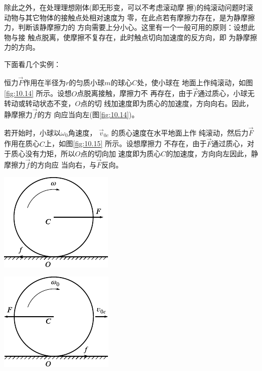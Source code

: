 除此之外，在处理理想刚体(即无形变，可以不考虑滚动摩
擦)的纯滚动问题时滚动物与其它物体的接触点处相对速度为
零，在此点若有摩擦力存在，是为静摩擦力，判断该静摩擦力的
方向需要上分小心。这里有一个一般可用的原则：设想此物与接
触点脱离，使摩擦不复存在，此时触点切向加速度的反方向，即
为静摩擦力的方向。

下面看几个实例：

恒力$\vec{ F }$作用在半径为$ r $的匀质小球$ m $的球心$ C $处，使小球在
地面上作纯滚动，如图\ref{fig:10.14} 所示。设想$ O $点脱离接触，摩擦力不
再存在，由于$\vec{ F }$通过质心，小球无转动或转动状态不变，$ O $点的切
线加速度即为质心的加速度，方向向右。因此，静摩擦力$ \vec{f} $的方
向应当向左(图\ref{fig:10.14})。

若开始时，小球以$ \omega_{ 0 } $角速度， $ \vec{v} _ { 0c } $  的质心速度在水平地面上作
纯滚动，然后力$\vec{F}$作用在质心$ C $上，如图\ref{fig:10.15} 所示。设想摩擦力
不存在，由于$\vec{ F }$通过质心，对于质心没有力矩，所以$ O $点的切向加
速度即为质心$ C $的加速度，方向向左因此，静摩擦力$\vec{f}$的方向应
当向右，与$\vec{F}$反向。

\begin{figurex}
    \begin{minipage}{0.5\linewidth}
        \centering
        \includegraphics{figure/fig10.14}
        \caption{}
        \label{fig:10.14}
    \end{minipage}
    \begin{minipage}{0.5\linewidth}
        \centering
        \includegraphics{figure/fig10.15}
        \caption{}
        \label{fig:10.15}
    \end{minipage}
\end{figurex}

